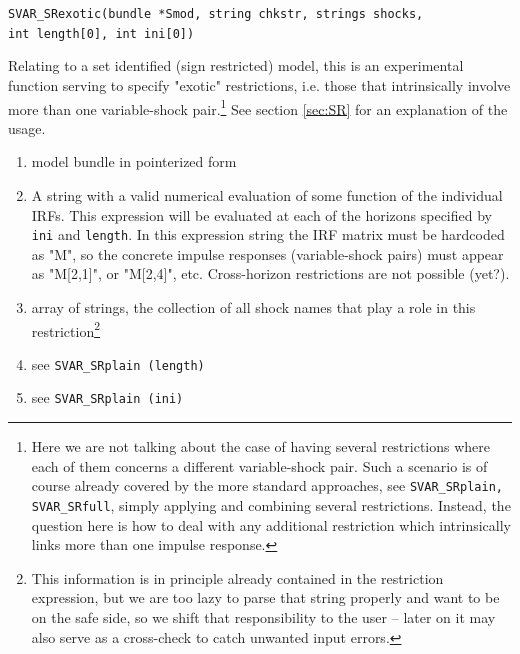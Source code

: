 \documentclass[a4paper,10pt]{article}
\newenvironment{funcdoc}[1]
{\noindent\hrulefill\newline\nopagebreak\texttt{#1}%
\nopagebreak\par\noindent\hrulefill%
\nopagebreak\par\nopagebreak\smallskip\nopagebreak\par}
{\bigskip}
\begin{document}
\begin{funcdoc}{SVAR\_SRexotic(bundle *Smod, string chkstr, strings shocks, \\
 int length[0], int ini[0])} %
 
 Relating to a set identified (sign restricted) model, this is an experimental function serving 
 to specify "exotic" restrictions, i.e. those that intrinsically involve more than one 
 variable-shock pair.\footnote{Here we are not talking about the case of having several 
 restrictions where each of them concerns a different variable-shock pair. Such a scenario 
 is of course already covered
 by the more standard approaches, see \texttt{SVAR\_SRplain, SVAR\_SRfull}, simply 
 applying and combining several restrictions. Instead, the question here is how to deal 
 with any additional restriction which intrinsically links more than one impulse response.}
 See section \ref{sec:SR} for an explanation of the usage. 
 
 \begin{enumerate}
  \item model bundle in pointerized form
  \item A string with a valid numerical evaluation of some function of the individual IRFs.  
  This expression will be evaluated at each of the horizons specified by \texttt{ini} and 
  \texttt{length}. In this expression string the IRF matrix must be hardcoded as "M", so
  the concrete impulse responses (variable-shock pairs) must appear as "M[2,1]", or "M[2,4]",
  etc. 
  Cross-horizon restrictions are not possible (yet?).
  \item array of strings, the collection of all shock names that play a role in this restriction\footnote{%
  This information is in principle already contained in the restriction expression, but we are too 
  lazy to parse that string properly and want to be on the safe side, so we shift that responsibility
  to the user -- later on it may also serve as a cross-check to catch unwanted input errors.}
  \item see \texttt{SVAR\_SRplain (length)}
  \item see \texttt{SVAR\_SRplain (ini)}
 \end{enumerate}
 
\end{funcdoc}
\end{document}
